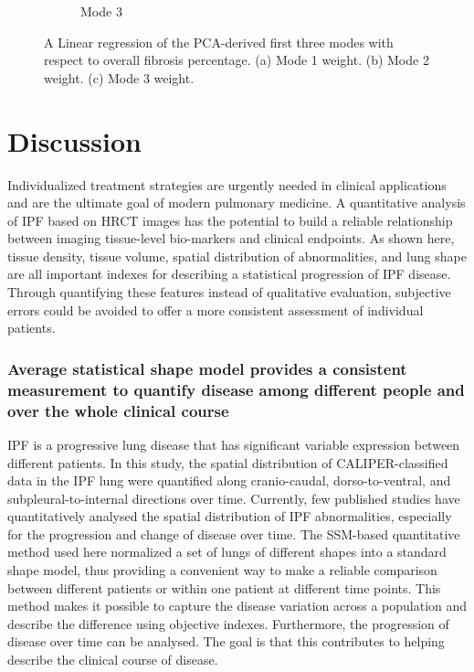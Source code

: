 \begin{figure}[H]
\begin{subfigure}{.72\linewidth}
  \caption{Mode 3}
  \label{fig:ShapeVSFibrosis-c}
\end{subfigure}
\caption{ A Linear regression of the PCA-derived first three modes with respect to overall fibrosis percentage. (a) Mode 1 weight. (b) Mode 2 weight. (c) Mode 3  weight.}
\label{fig:ShapeVSFibrosis}
\end{figure}

\section{Discussion} \label{QuantitativeDiscussion}
Individualized treatment strategies are urgently needed in clinical applications and are the ultimate goal of modern pulmonary medicine. A quantitative analysis of IPF based on HRCT images has the potential to build a reliable relationship between imaging tissue-level bio-markers and clinical endpoints. As shown here, tissue density, tissue volume, spatial distribution of abnormalities, and lung shape are all important indexes for describing a statistical progression of IPF disease. Through quantifying these features instead of qualitative evaluation, subjective errors could be avoided to offer a more consistent assessment of individual patients.  

\subsubsection{Average statistical shape model provides a consistent measurement to quantify disease among different people and over the whole clinical course}
IPF is a progressive lung disease that has significant variable expression between different patients. In this study, the spatial distribution of CALIPER-classified data in the IPF lung were quantified along cranio-caudal, dorso-to-ventral, and subpleural-to-internal directions over time. Currently, few published studies have quantitatively analysed the spatial distribution of IPF abnormalities, especially for the progression and change of disease over time. The SSM-based quantitative method used here normalized a set of lungs of different shapes into a standard shape model, thus providing a convenient way to make a reliable comparison between different patients or within one patient at different time points. This method makes it possible to capture the disease variation across a population and describe the difference using objective indexes. Furthermore, the progression of disease over time can be analysed. The goal is that this contributes to helping describe the clinical course of disease. 

